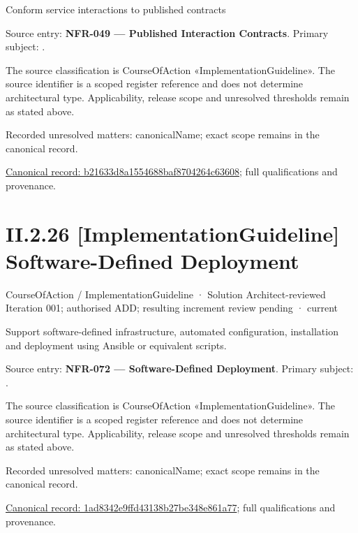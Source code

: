 Conform service interactions to published contracts



Source entry: \textbf{NFR-049 — Published Interaction Contracts}. Primary subject: \texttt{}.



The source classification is CourseOfAction «ImplementationGuideline». The source identifier is a scoped register reference and does not determine architectural type. Applicability, release scope and unresolved thresholds remain as stated above.


{\small Recorded unresolved matters: canonicalName; exact scope remains in the canonical record.}\par
{\footnotesize \href{../../../../../../../continuum/strategy/course-of-action/implementation-guideline/b21633d8a1554688baf8704264c63608.md}{Canonical record: b21633d8a1554688baf8704264c63608}; full qualifications and provenance.}\par
\section*{II.2.26 [ImplementationGuideline] Software-Defined Deployment}
\label{navigation:II.2.26}

\label{element:1ad8342e9ffd43138b27be348e861a77}
{\small CourseOfAction / ImplementationGuideline · Solution Architect-reviewed Iteration 001; authorised ADD; resulting increment review pending · current}\par

Support software-defined infrastructure, automated configuration, installation and deployment using Ansible or equivalent scripts.



Source entry: \textbf{NFR-072 — Software-Defined Deployment}. Primary subject: \texttt{}.



The source classification is CourseOfAction «ImplementationGuideline». The source identifier is a scoped register reference and does not determine architectural type. Applicability, release scope and unresolved thresholds remain as stated above.


{\small Recorded unresolved matters: canonicalName; exact scope remains in the canonical record.}\par
{\footnotesize \href{../../../../../../../continuum/strategy/course-of-action/implementation-guideline/1ad8342e9ffd43138b27be348e861a77.md}{Canonical record: 1ad8342e9ffd43138b27be348e861a77}; full qualifications and provenance.}\par
